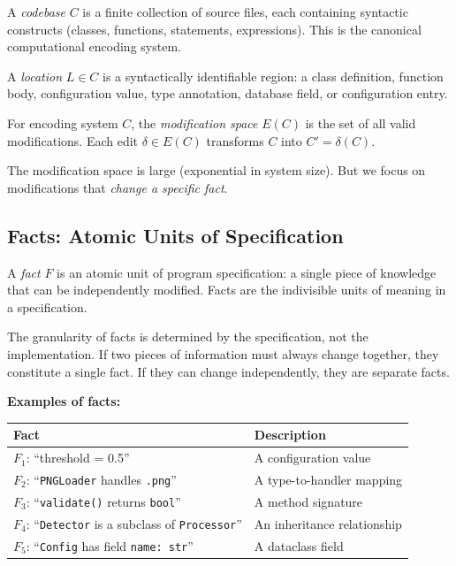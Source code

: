 \begin{definition}
A \emph{codebase} $C$ is a finite collection of source files, each containing syntactic constructs (classes, functions, statements, expressions). This is the canonical computational encoding system.
\end{definition}

\begin{definition}[Location]
A \emph{location} $L \in C$ is a syntactically identifiable region: a class definition, function body, configuration value, type annotation, database field, or configuration entry.
\end{definition}

\begin{definition}
For encoding system $C$, the \emph{modification space} $E(C)$ is the set of all valid modifications. Each edit $\delta \in E(C)$ transforms $C$ into $C' = \delta(C)$.
\end{definition}

The modification space is large (exponential in system size). But we focus on modifications that \emph{change a specific fact}.

\subsection{Facts: Atomic Units of Specification}\label{sec:facts}

\begin{definition}[Fact]\label{def:fact}
A \emph{fact} $F$ is an atomic unit of program specification: a single piece of knowledge that can be independently modified. Facts are the indivisible units of meaning in a specification.
\end{definition}

The granularity of facts is determined by the specification, not the implementation. If two pieces of information must always change together, they constitute a single fact. If they can change independently, they are separate facts.

\noindent\textbf{Examples of facts:}

\begin{center}
\small
\setlength{\tabcolsep}{3pt}
\begin{tabularx}{\linewidth}{@{}>{\RaggedRight\arraybackslash\hsize=0.95\hsize}X>{\RaggedRight\arraybackslash\hsize=1.05\hsize}X@{}}
\toprule
\textbf{Fact} & \textbf{Description} \\
\midrule
$F_1$: ``threshold = 0.5'' & A configuration value \\
$F_2$: ``\texttt{PNGLoader} handles \texttt{.png}'' & A type-to-handler mapping \\
$F_3$: ``\texttt{validate()} returns \texttt{bool}'' & A method signature \\
$F_4$: ``\texttt{Detector} is a subclass of \texttt{Processor}'' & An inheritance relationship \\
$F_5$: ``\texttt{Config} has field \texttt{name: str}'' & A dataclass field \\
\bottomrule
\end{tabularx}
\end{center}

